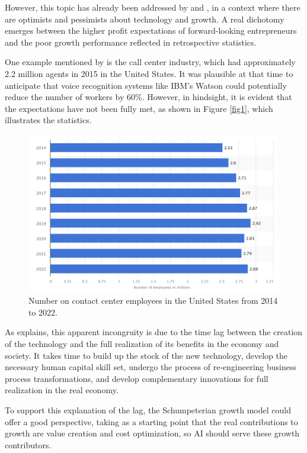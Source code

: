 \documentclass[preprint, 1p,
authoryear]{elsarticle} %
\begin{document}
However, this topic has already been addressed by \citep{paradox} and
\citep{Nicholas}, in a context where there are optimists and pessimists
about technology and growth. A real dichotomy emerges between the higher
profit expectations of forward-looking entrepreneurs and the poor growth
performance reflected in retrospective statistics.

One example mentioned by \citep{paradox} is the call center industry,
which had approximately 2.2 million agents in 2015 in the United States.
It was plausible at that time to anticipate that voice recognition
systems like IBM's Watson could potentially reduce the number of workers
by 60\%. However, in hindsight, it is evident that the expectations have
not been fully met, as shown in Figure \ref{fig1}, which illustrates the
statistics.

\begin{figure}

{\centering \includegraphics[width=0.7\linewidth]{../Views/contact_center_employees_US} 

}

\caption{\label{fig1}Number on contact center employees in the United States from 2014 to 2022.}\label{fig:fig1}
\end{figure}

As \citep{paradox} explains, this apparent incongruity is due to the
time lag between the creation of the technology and the full realization
of its benefits in the economy and society. It takes time to build up
the stock of the new technology, develop the necessary human capital
skill set, undergo the process of re-engineering business process
transformations, and develop complementary innovations for full
realization in the real economy.

To support this explanation of the lag, the Schumpeterian growth model
could offer a good perspective, taking as a starting point that the real
contributions to growth are value creation and cost optimization, so AI
should serve these growth contributors.
\end{document}
